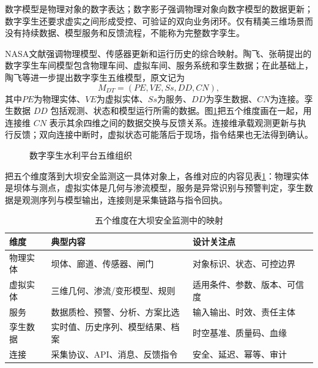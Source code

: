 数字模型是物理对象的数字表达；数字影子强调物理对象向数字模型的数据更新；数字孪生还要求虚实之间形成受控、可验证的双向业务闭环。仅有精美三维场景而没有持续数据、模型服务和反馈流程，不能称为完整数字孪生。

NASA文献强调物理模型、传感器更新和运行历史的综合映射\cite{glaessgen2012}。陶飞、张萌提出的数字孪生车间模型包含物理车间、虚拟车间、服务系统和孪生数据\cite{tao2017dts}；在此基础上，陶飞等进一步提出数字孪生五维模型\cite{tao2019fivedim}，原文记为
\[
  M_{DT}=(PE,VE,Ss,DD,CN),
\]
其中$PE$为物理实体、$VE$为虚拟实体、$Ss$为服务、$DD$为孪生数据、$CN$为连接。孪生数据 $DD$ 包括观测、状态和模型运行所需的数据。图\ref{fig:dt-five-dimensions}把五个维度画在一起，用连接维 $CN$ 表示其余四维之间的数据交换与反馈关系。连接维承载观测更新与执行反馈；双向连接中断时，虚拟状态可能落后于现场，指令结果也无法得到确认。

\begin{figure}[htbp]
\centering
{}
\caption{数字孪生水利平台五维组织}
\label{fig:dt-five-dimensions}
\end{figure}

把五个维度落到大坝安全监测这一具体对象上，各维对应的内容见表\ref{tab:dt-five-dimensions}：物理实体是坝体与测点，虚拟实体是几何与渗流模型，服务是异常识别与预警判定，孪生数据是观测序列与模型输出，连接则是采集链路与指令回执。

\begin{table}[htbp]
\centering
\caption{五个维度在大坝安全监测中的映射}
\label{tab:dt-five-dimensions}
\begin{tabular}{p{2.2cm}p{4.2cm}p{6.2cm}}
\toprule
维度 & 典型内容 & 设计关注点 \\
\midrule
物理实体 & 坝体、廊道、传感器、闸门 & 对象标识、状态、可控边界 \\
虚拟实体 & 三维几何、渗流/变形模型、规则 & 适用条件、参数、版本、可信度 \\
服务 & 数据质检、预警、分析、方案比选 & 输入输出、时效、责任主体 \\
孪生数据 & 实时值、历史序列、模型结果、档案 & 时空基准、质量码、血缘 \\
连接 & 采集协议、API、消息、反馈指令 & 安全、延迟、幂等、审计 \\
\bottomrule
\end{tabular}
\end{table}


